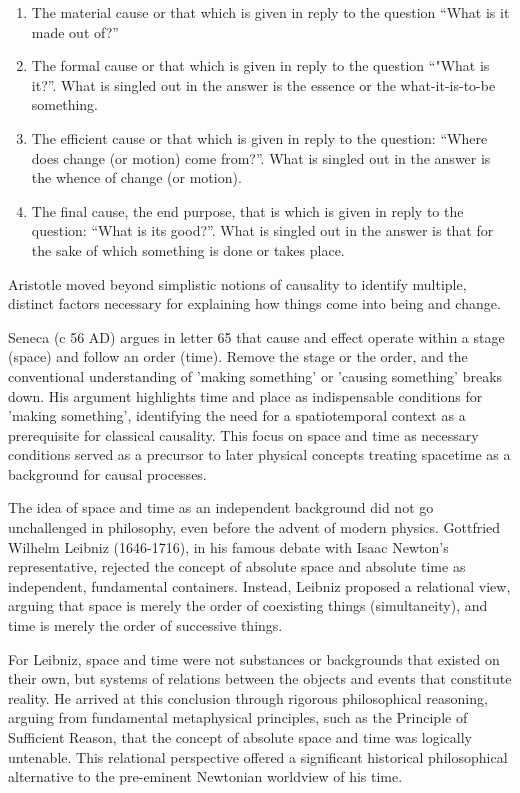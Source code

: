 \begin{enumerate}
    \item The material cause or that which is given in reply to the question “What is it made out of?” 
    \item The formal cause or that which is given in reply to the question “"What is it?”. What is singled out in the answer is the essence or the what-it-is-to-be something.
    \item The efficient cause or that which is given in reply to the question: “Where does change (or motion) come from?”. What is singled out in the answer is the whence of change (or motion).
    \item The final cause, the end purpose, that is which is given in reply to the question: “What is its good?”. What is singled out in the answer is that for the sake of which something is done or takes place.

\end{enumerate}

Aristotle moved beyond simplistic notions of causality to identify multiple, distinct factors necessary for explaining how things come into being and change. 

Seneca (c 56 AD) argues in letter 65\cite{Seneca_Letters} that cause and effect operate within a stage (space) and follow an order (time). Remove the stage or the order, and the conventional understanding of 'making something' or 'causing something' breaks down. His argument highlights time and place as indispensable conditions for 'making something', identifying the need for a spatiotemporal context as a prerequisite for classical causality. This focus on space and time as necessary conditions served as a precursor to later physical concepts treating spacetime as a background for causal processes.

The idea of space and time as an independent background did not go unchallenged in philosophy, even before the advent of modern physics. Gottfried Wilhelm Leibniz (1646-1716), in his famous debate with Isaac Newton's representative, rejected the concept of absolute space and absolute time as independent, fundamental containers. Instead, Leibniz proposed\cite{SEP_LeibnizPhysics} a relational view, arguing that space is merely the order of coexisting things (simultaneity), and time is merely the order of successive things. 

For Leibniz, space and time were not substances or backgrounds that existed on their own, but systems of relations between the objects and events that constitute reality. He arrived at this conclusion through rigorous philosophical reasoning, arguing from fundamental metaphysical principles, such as the Principle of Sufficient Reason, that the concept of absolute space and time was logically untenable. This relational perspective offered a significant historical philosophical alternative to the pre-eminent Newtonian worldview of his time.

